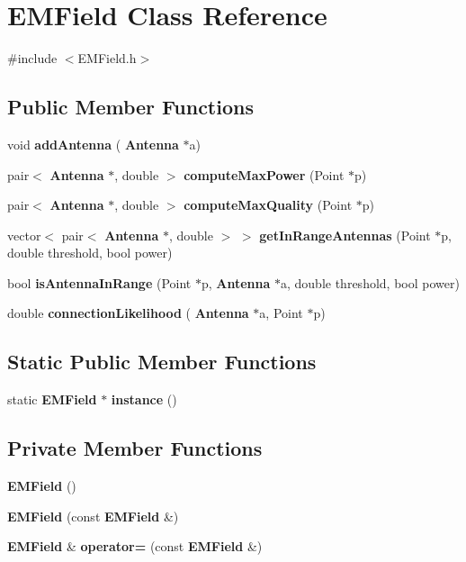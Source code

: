 \section{E\+M\+Field Class Reference}
\label{class_e_m_field}


{\ttfamily \#include $<$E\+M\+Field.\+h$>$}

\subsection*{Public Member Functions}
\begin{DoxyCompactItemize}
\item 
void \textbf{ add\+Antenna} (\textbf{ Antenna} $\ast$a)
\item 
pair$<$ \textbf{ Antenna} $\ast$, double $>$ \textbf{ compute\+Max\+Power} (Point $\ast$p)
\item 
pair$<$ \textbf{ Antenna} $\ast$, double $>$ \textbf{ compute\+Max\+Quality} (Point $\ast$p)
\item 
vector$<$ pair$<$ \textbf{ Antenna} $\ast$, double $>$ $>$ \textbf{ get\+In\+Range\+Antennas} (Point $\ast$p, double threshold, bool power)
\item 
bool \textbf{ is\+Antenna\+In\+Range} (Point $\ast$p, \textbf{ Antenna} $\ast$a, double threshold, bool power)
\item 
double \textbf{ connection\+Likelihood} (\textbf{ Antenna} $\ast$a, Point $\ast$p)
\end{DoxyCompactItemize}
\subsection*{Static Public Member Functions}
\begin{DoxyCompactItemize}
\item 
static \textbf{ E\+M\+Field} $\ast$ \textbf{ instance} ()
\end{DoxyCompactItemize}
\subsection*{Private Member Functions}
\begin{DoxyCompactItemize}
\item 
\textbf{ E\+M\+Field} ()
\item 
\textbf{ E\+M\+Field} (const \textbf{ E\+M\+Field} \&)
\item 
\textbf{ E\+M\+Field} \& \textbf{ operator=} (const \textbf{ E\+M\+Field} \&)
\end{DoxyCompactItemize}
